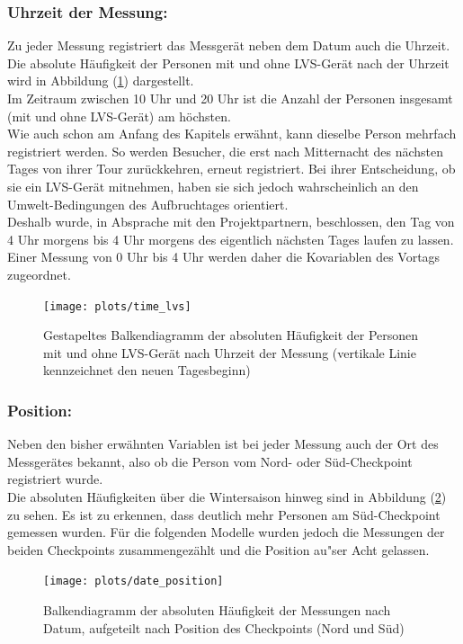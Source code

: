 \documentclass[12pt]{scrreprt}
\begin{document}
\newpage
\subsubsection*{Uhrzeit der Messung:}
Zu jeder Messung registriert das Messgerät neben dem Datum auch die Uhrzeit. Die absolute Häufigkeit der Personen mit und ohne LVS-Gerät nach der Uhrzeit wird in Abbildung (\ref{pic:time_lvs}) dargestellt. \\
Im Zeitraum zwischen 10 Uhr und 20 Uhr ist die Anzahl der Personen insgesamt (mit und ohne LVS-Gerät) am höchsten. \\
Wie auch schon am Anfang des Kapitels erwähnt, kann dieselbe Person mehrfach registriert werden. So werden Besucher, die erst nach Mitternacht des nächsten Tages von ihrer Tour zurückkehren, erneut registriert. Bei ihrer Entscheidung, ob sie ein LVS-Gerät mitnehmen, haben sie sich jedoch wahrscheinlich an den Umwelt-Bedingungen des Aufbruchtages orientiert. \\
Deshalb wurde, in Absprache mit den Projektpartnern, beschlossen, den Tag von 4 Uhr morgens bis 4 Uhr morgens des eigentlich nächsten Tages laufen zu lassen. Einer Messung von 0 Uhr bis 4 Uhr werden daher die Kovariablen des Vortags zugeordnet. 
\begin{figure}[H]
	\centering
	\texttt{[image: plots/time\_lvs]}
	\caption{Gestapeltes Balkendiagramm der absoluten Häufigkeit der Personen mit und ohne LVS-Gerät nach Uhrzeit der Messung (vertikale Linie kennzeichnet den neuen Tagesbeginn)}
	\label{pic:time_lvs}	
\end{figure}

\newpage
\subsubsection*{Position:}
Neben den bisher erwähnten Variablen ist bei jeder Messung auch der Ort des Messgerätes bekannt, also ob die Person vom Nord- oder Süd-Checkpoint registriert wurde. \\
Die absoluten Häufigkeiten über die Wintersaison hinweg sind in Abbildung (\ref{pic:date_position}) zu sehen. Es ist zu erkennen, dass deutlich mehr Personen am Süd-Checkpoint gemessen wurden. Für die folgenden Modelle wurden jedoch die Messungen der beiden Checkpoints zusammengezählt und die Position au"ser Acht gelassen.
\begin{figure}[H]
	\centering
	\texttt{[image: plots/date\_position]}
	\caption{Balkendiagramm der absoluten Häufigkeit der Messungen nach Datum, aufgeteilt nach Position des Checkpoints (Nord und Süd)}
	\label{pic:date_position}	
\end{figure}
\end{document}
